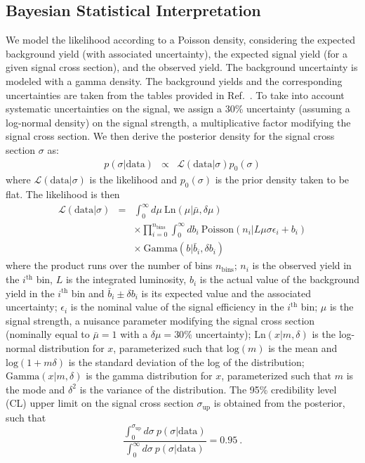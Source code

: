 \subsection{Bayesian Statistical Interpretation}
We model the likelihood according to a Poisson density,
considering the expected background yield (with associated
uncertainty), the expected signal yield (for a given signal cross
section), and the observed yield. The background uncertainty is modeled with a gamma density. The
background yields and the corresponding uncertainties are taken from the tables provided
in Ref.~\cite{RazorHgaga}. To take into account systematic
uncertainties on the signal, we assign a 30\% uncertainty (assuming a
log-normal density) on the signal strength, a multiplicative
factor modifying the signal cross section. We then derive the
posterior density for the signal cross section $\sigma$ as:
\begin{eqnarray}
p(\sigma|\mathrm{data}) &\propto& \mathcal L(\mathrm{data} |\sigma)
                                  p_0(\sigma)
\label{eqn:posterior}
\end{eqnarray}
where $\mathcal L(\mathrm{data} |\sigma)$ is the likelihood and $p_0(\sigma)$ is the prior density taken to be
flat. The likelihood is then
\begin{eqnarray}
\mathcal L(\mathrm{data} |\sigma) &=&\int_{0}^{\infty}d\mu~\mathrm{Ln}(\mu|\bar\mu,\delta\mu)\nonumber\\
&&\times\prod_{i=0}^{n_{\mathrm{bins}}}\int_0^{\infty} db_i~
   \mathrm{Poisson}(n_i|L\mu\sigma\epsilon_i+ b_i)\nonumber\\
&&\times~\mathrm{Gamma}(b|\bar{b}_i,\delta b_i)
\label{eqn:likelihood}
\end{eqnarray}
where the product runs over the number of bins $n_{\mathrm{bins}}$; $n_i$ is the
observed yield in the $i^{\mathrm{th}}$ bin, $L$ is the integrated
luminosity, $b_i$ is the actual value of the background yield in the
$i^{\mathrm{th}}$ bin and $\bar{b}_i\pm \delta b_i$ is its expected value
and the associated uncertainty; $\epsilon_i$ is the nominal value
of the signal efficiency in the $i^{\mathrm{th}}$ bin; $\mu$ is the
signal strength, a nuisance parameter modifying the signal cross section
(nominally equal to $\bar\mu=1$ with a $\delta\mu=30\%$ uncertainty);
$\mathrm{Ln}(x|m,\delta)$ is the log-normal
distribution for $x$, parameterized such that $\mathrm{log}(m)$ is the
mean and $\mathrm{log}(1+m\delta)$ is the standard deviation of the
log of the distribution; $\mathrm{Gamma}(x|m,\delta)$ is the gamma
distribution for $x$, parameterized such that $m$ is the
mode and $\delta^2$ is the variance of the distribution. The 95\%
credibility level (CL) upper limit on the
signal cross section $\sigma_{\mathrm{up}}$ is obtained from the
posterior, such that 
\begin{equation}
\frac{\int_0^{\sigma_{\mathrm{up}}}d\sigma~ p(\sigma|\mathrm{data})}{\int_0^{\infty}d\sigma~ p(\sigma|\mathrm{data})} = 0.95~.
\end{equation}

